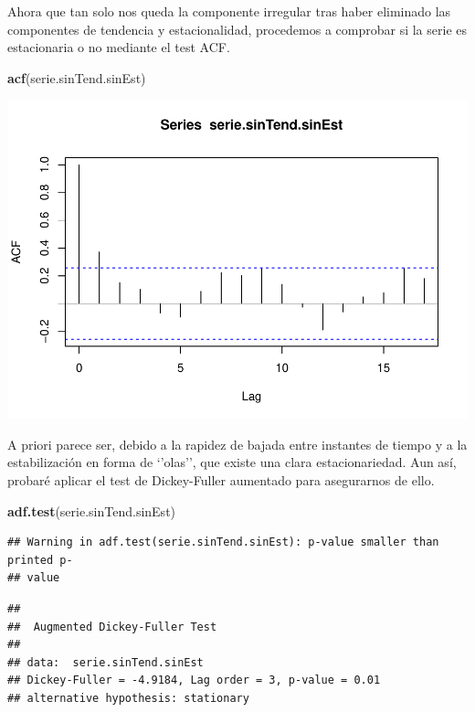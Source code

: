 \documentclass[]{article}
\newenvironment{Shaded}{\begin{snugshade}}{\end{snugshade}}
\newcommand{\KeywordTok}[1]{\textcolor[rgb]{0.13,0.29,0.53}{\textbf{#1}}}
\newcommand{\NormalTok}[1]{#1}
\begin{document}
Ahora que tan solo nos queda la componente irregular tras haber
eliminado las componentes de tendencia y estacionalidad, procedemos a
comprobar si la serie es estacionaria o no mediante el test ACF.

\begin{Shaded}
\begin{Highlighting}[]
\KeywordTok{acf}\NormalTok{(serie.sinTend.sinEst)}
\end{Highlighting}
\end{Shaded}

\includegraphics{timeSeries_files/figure-latex/unnamed-chunk-21-1.pdf}

A priori parece ser, debido a la rapidez de bajada entre instantes de
tiempo y a la estabilización en forma de `'olas'', que existe una clara
estacionariedad. Aun así, probaré aplicar el test de Dickey-Fuller
aumentado para asegurarnos de ello.

\begin{Shaded}
\begin{Highlighting}[]
\KeywordTok{adf.test}\NormalTok{(serie.sinTend.sinEst)}
\end{Highlighting}
\end{Shaded}

\begin{verbatim}
## Warning in adf.test(serie.sinTend.sinEst): p-value smaller than printed p-
## value
\end{verbatim}

\begin{verbatim}
## 
##  Augmented Dickey-Fuller Test
## 
## data:  serie.sinTend.sinEst
## Dickey-Fuller = -4.9184, Lag order = 3, p-value = 0.01
## alternative hypothesis: stationary
\end{verbatim}
\end{document}
